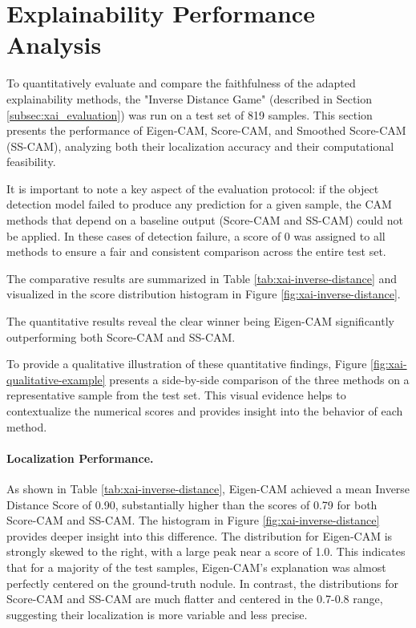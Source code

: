 \section{Explainability Performance Analysis}

To quantitatively evaluate and compare the faithfulness of the adapted explainability methods, the "Inverse Distance Game" (described in Section \ref{subsec:xai_evaluation}) was run on a test set of 819 samples. This section presents the performance of Eigen-CAM, Score-CAM, and Smoothed Score-CAM (SS-CAM), analyzing both their localization accuracy and their computational feasibility.

It is important to note a key aspect of the evaluation protocol: if the object detection model failed to produce any prediction for a given sample, the CAM methods that depend on a baseline output (Score-CAM and SS-CAM) could not be applied. In these cases of detection failure, a score of 0 was assigned to all methods to ensure a fair and consistent comparison across the entire test set.

The comparative results are summarized in Table \ref{tab:xai-inverse-distance} and visualized in the score distribution histogram in Figure \ref{fig:xai-inverse-distance}.





The quantitative results reveal the clear winner being Eigen-CAM significantly outperforming both Score-CAM and SS-CAM.

To provide a qualitative illustration of these quantitative findings, Figure \ref{fig:xai-qualitative-example} presents a side-by-side comparison of the three methods on a representative sample from the test set. This visual evidence helps to contextualize the numerical scores and provides insight into the behavior of each method.


\paragraph{Localization Performance.}
As shown in Table \ref{tab:xai-inverse-distance}, Eigen-CAM achieved a mean Inverse Distance Score of 0.90, substantially higher than the scores of 0.79 for both Score-CAM and SS-CAM. The histogram in Figure \ref{fig:xai-inverse-distance} provides deeper insight into this difference. The distribution for Eigen-CAM is strongly skewed to the right, with a large peak near a score of 1.0. This indicates that for a majority of the test samples, Eigen-CAM's explanation was almost perfectly centered on the ground-truth nodule. In contrast, the distributions for Score-CAM and SS-CAM are much flatter and centered in the 0.7-0.8 range, suggesting their localization is more variable and less precise.

